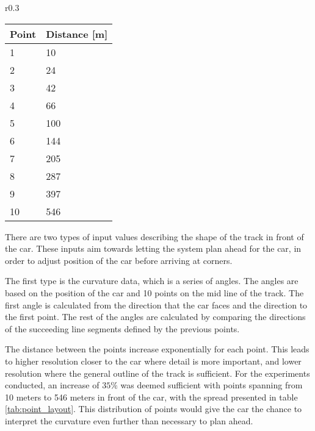 \begin{wraptable}{r}{0.3\textwidth}
    \hspace{5pt}
    \begin{tabular}{ll}
    \toprule
    Point & Distance [m]\\
    \midrule
    1 & 10\\
    2 & 24\\
    3 & 42\\
    4 & 66\\
    5 & 100\\
    6 & 144\\
    7 & 205\\
    8 & 287\\
    9 & 397\\
    10 & 546\\
    \bottomrule
    \end{tabular}
    \caption{Distance from the car to each point as given input.}
    \label{tab:point_layout}
\end{wraptable}

\noindent
There are two types of input values describing the shape of the track in front of the car. These inputs aim towards letting the system plan ahead for the car, in order to adjust position of the car before arriving at corners. 

The first type is the curvature data, which is a series of angles. The angles are based on the position of the car and 10 points on the mid line of the track. The first angle is calculated from the direction that the car faces and the direction to the first point. The rest of the angles are calculated by comparing the directions of the succeeding line segments defined by the previous points.

The distance between the points increase exponentially for each point. This leads to higher resolution closer to the car where detail is more important, and lower resolution where the general outline of the track is sufficient. For the experiments conducted, an increase of $35\%$ was deemed sufficient with points spanning from 10 meters to 546 meters in front of the car, with the spread presented in table \ref{tab:point_layout}. This distribution of points would give the car the chance to interpret the curvature even further than necessary to plan ahead.




